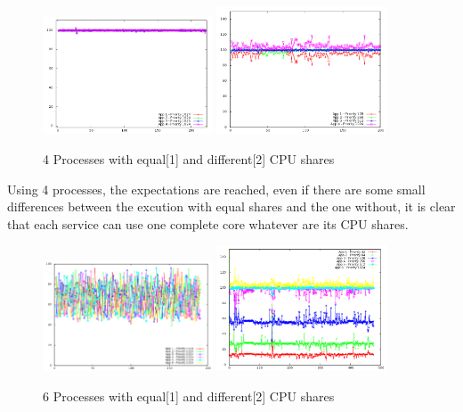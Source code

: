 \begin{figure}[h!]
\begin{center}
	\includegraphics[width=0.45\textwidth]{./Images/CpuMonitor/laptop/4_equalshares.png}
	\includegraphics[width=0.45\textwidth]{./Images/CpuMonitor/laptop/4_differentshares.png}
	\caption{4 Processes with equal[1] and different[2] CPU shares}
\end{center}
\end{figure}

Using 4 processes, the expectations are reached, even if there are some small
differences between the excution with equal shares and the one without, it is
clear that each service can use one complete core whatever are its CPU shares.

\begin{figure}[h!]
\begin{center}
	\includegraphics[width=0.45\textwidth]{./Images/CpuMonitor/laptop/6_equalshares.png}
	\includegraphics[width=0.45\textwidth]{./Images/CpuMonitor/laptop/6_differentshares.png}
	\caption{6 Processes with equal[1] and different[2] CPU shares}
\end{center}
\end{figure}

